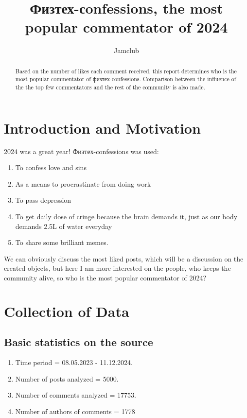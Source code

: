 \documentclass[
	11pt
] {article}
\author[1]{Jamclub}
\affil[1]{Физтех-confessions}
\title{Физтех-сonfessions, the most popular commentator of 2024}
\begin{document}
\maketitle
\renewcommand{\arraystretch}{1.3}

\begin{abstract}
	Based on the number of likes each comment received, this report determines who is the most popular commentator of физтех-confessions. Comparison between the influence of the the top few commentators and the rest of the community is also made.
\end{abstract}

\tableofcontents


\section{Introduction and Motivation}
	2024 was a great year! Физтех-confessions was used:
	\begin{enumerate}
		\item To confess love and sins
		\item As a means to procrastinate from doing work
		\item To pass depression
		\item To get daily dose of cringe because the brain demands it, just as our body demands \num{2.5}L of water everyday
		\item To share some brilliant memes.
	\end{enumerate}
	We can obviously discuss the most liked posts, which will be a discussion on the created objects, but here I am more interested on the people, who keeps the community alive, so who is the most popular commentator of 2024?

\section{Collection of Data}
	\subsection{Basic statistics on the source}
		\begin{enumerate}
			\item Time period = 08.05.2023 - 11.12.2024.
			\item Number of posts analyzed = 5000.
			\item Number of comments analyzed = 17753.
			\item Number of authors of comments = 1778
		\end{enumerate}
\end{document}

